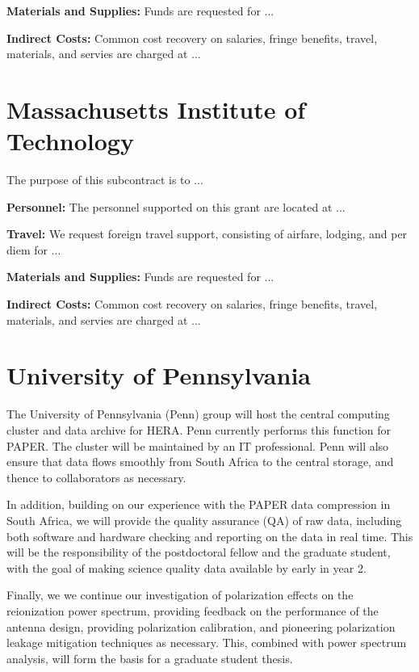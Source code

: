 \documentclass[onecolumn,11pt]{aastex}
\begin{document}
{\bf Materials and Supplies:}  Funds are requested for ... 

{\bf Indirect Costs:}
Common cost recovery on salaries, fringe benefits, travel, materials, and servies are
charged at ...



\section{Massachusetts Institute of Technology}
The purpose of this subcontract is to ...

{\bf Personnel:} 
The personnel supported on this grant are located at ...

{\bf Travel:} We request foreign travel support, consisting of airfare, lodging,
and per diem for ...

{\bf Materials and Supplies:}  Funds are requested for ... 

{\bf Indirect Costs:}
Common cost recovery on salaries, fringe benefits, travel, materials, and servies are
charged at ...



\section{University of Pennsylvania}

The University of Pennsylvania (Penn) group will host the central computing cluster and data archive for HERA.  Penn currently performs this function for PAPER.  The cluster will be maintained by an IT professional.  Penn will also ensure that data flows smoothly from South Africa to the central storage, and thence to collaborators as necessary.

In addition, building on our experience with the PAPER data compression in South Africa, we will provide the quality assurance (QA) of raw data, including both software and hardware checking and reporting on the data in real time.  This will be the responsibility of the postdoctoral fellow and the graduate student, with the goal of making science quality data available by early in year 2.  

Finally, we we continue our investigation of polarization effects on the reionization power spectrum, providing feedback on the performance of the antenna design, providing polarization calibration, and pioneering polarization leakage mitigation techniques as necessary.  This, combined with power spectrum analysis, will form the basis for a graduate student thesis.
\end{document}
